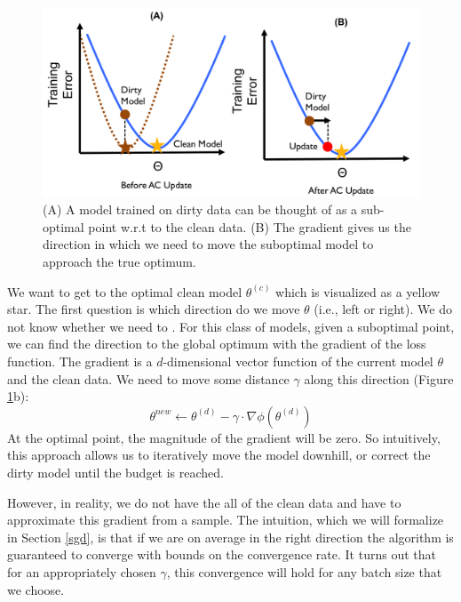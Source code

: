 \begin{figure}[ht!]
\centering
 \includegraphics[width=0.7\columnwidth]{figs/update-arch2.png}
 \caption{(A) A model trained on dirty data can be thought of as a sub-optimal point w.r.t to the clean data. (B) The gradient gives us the direction in which we need to move the suboptimal model to approach the true optimum. \label{update-arch2}}
\end{figure}

We want to get to the optimal clean model $\theta^{(c)}$ which is visualized as a yellow star.
The first question is which direction do we move $\theta$ (i.e., left or right).
We do not know whether we need to .
For this class of models, given a suboptimal point, we can find the direction to 
the global optimum with the gradient of the loss function.
The gradient is a $d$-dimensional vector function of the current model $\theta$ and the clean data.
We need to move some distance $\gamma$ along this direction (Figure \ref{update-arch2}b):
\[
\theta^{new} \leftarrow \theta^{(d)} - \gamma \cdot \nabla\phi(\theta^{(d)})
\]
At the optimal point, the magnitude of the gradient will be zero.
So intuitively, this approach allows us to iteratively move the model downhill, or correct the dirty model until the budget is reached.

However, in reality, we do not have the all of the clean data and have to approximate this gradient from a sample.
The intuition, which we will formalize in Section \ref{sgd}, is that if we are on average in the right direction the algorithm is guaranteed to converge with bounds on the convergence rate.
It turns out that for an appropriately chosen $\gamma$, this convergence will hold for any batch size that we choose.

